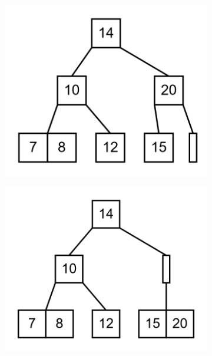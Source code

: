 \documentclass[11pt,a4paper]{article}
\begin{document}
\begin{loesung}
\begin{enumerate}
\begin{figure}[h!]
\begin{subfigure}[b]{0.31\textwidth}
                \includegraphics[scale=0.15]{img/3e/11}
            \end{subfigure}
            \begin{subfigure}[b]{0.31\textwidth}
                \centering
                \includegraphics[scale=0.15]{img/3e/12}
            \end{subfigure}
            \begin{subfigure}[b]{0.31\textwidth}
                \centering

\end{subfigure}
\end{figure}
\end{enumerate}
\end{loesung}
\end{document}
